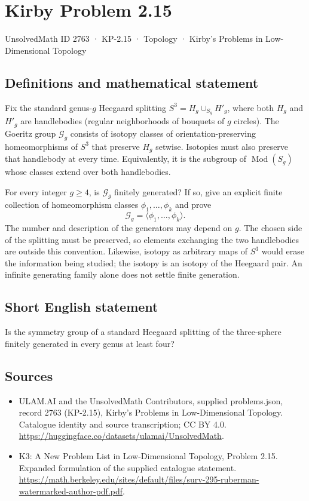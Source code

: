 \documentclass[11pt,a4paper]{article}
\begin{document}
\section*{Kirby Problem 2.15}\label{2763}
{\small UnsolvedMath ID 2763 · KP-2.15 · Topology · Kirby's Problems in Low-Dimensional Topology}
\subsection{Definitions and mathematical statement}
Fix the standard genus-$g$ Heegaard splitting
$S^3=H_g\cup_{S_g}H'_g$, where both $H_g$ and $H'_g$ are handlebodies
(regular neighborhoods of bouquets of $g$ circles). The Goeritz group
$\mathcal G_g$ consists of isotopy classes of orientation-preserving
homeomorphisms of $S^3$ that preserve $H_g$ setwise. Isotopies must also preserve
that handlebody at every time. Equivalently, it is the subgroup of
$\operatorname{Mod}(S_g)$ whose classes extend over both handlebodies.

For every integer $g\geq4$, is $\mathcal G_g$ finitely generated? If so, give
an explicit finite collection of homeomorphism classes
$\phi_1,\ldots,\phi_k$ and prove
\[
\mathcal G_g=\langle\phi_1,\ldots,\phi_k\rangle.
\]
The number and description of the generators may depend on $g$.
The chosen side of the splitting must be preserved, so elements exchanging
the two handlebodies are outside this convention. Likewise, isotopy as arbitrary
maps of $S^3$ would erase the information being studied; the isotopy is an
isotopy of the Heegaard pair. An infinite generating family alone does not
settle finite generation.
\subsection{Short English statement}
Is the symmetry group of a standard Heegaard splitting of the three-sphere finitely generated in every genus at least four?
\subsection{Sources}
\begin{itemize}
\item[S1] ULAM.AI and the UnsolvedMath Contributors, supplied problems.json, record 2763 (KP-2.15), Kirby's Problems in Low-Dimensional Topology. Catalogue identity and source transcription; CC BY 4.0.
\url{https://huggingface.co/datasets/ulamai/UnsolvedMath}.
\item[S2] K3: A New Problem List in Low-Dimensional Topology, Problem 2.15. Expanded formulation of the supplied catalogue statement.
\url{https://math.berkeley.edu/sites/default/files/surv-295-ruberman-watermarked-author-pdf.pdf}.
\end{itemize}
\end{document}
